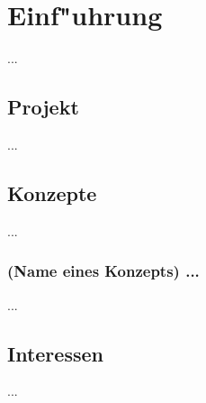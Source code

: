%
%


\chapter{Einf{"u}hrung}
\label{EF}

...
\\





\section{Projekt}
\label{EF:Projekt}

...
\\



\section{Konzepte}
\label{EF:Konzepte}

...
\\

\subsection{(Name eines Konzepts) ...}

...
\\





\section{Interessen}
\label{EF:Interessen}

...
\\












